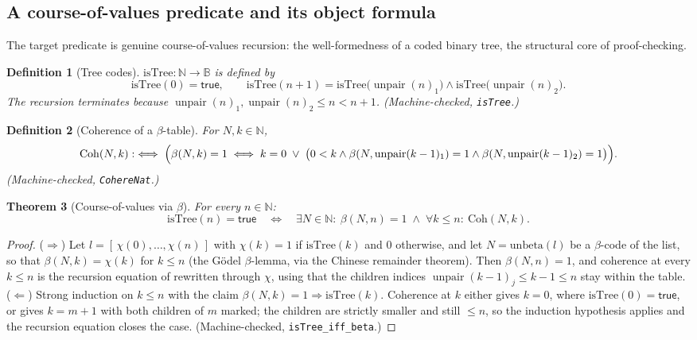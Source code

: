 \documentclass[11pt,a4paper]{article}
\newtheorem{theorem}{Theorem}[section]
\newtheorem{definition}[theorem]{Definition}
\newcommand{\Nat}{\mathbb{N}}
\newcommand{\Bool}{\mathbb{B}}
\newcommand{\unpair}{\operatorname{unpair}}
\begin{document}
\subsection{A course-of-values predicate and its object formula}

The target predicate is genuine course-of-values recursion: the
well-formedness of a coded binary tree, the structural core of
proof-checking.

\begin{definition}[Tree codes]
\label{def:istree}
$\mathrm{isTree} : \Nat \to \Bool$ is defined by
\[
  \mathrm{isTree}(0) = \mathsf{true},
  \qquad
  \mathrm{isTree}(n+1) =
  \mathrm{isTree}\bigl(\unpair(n)_1\bigr) \wedge
  \mathrm{isTree}\bigl(\unpair(n)_2\bigr).
\]
The recursion terminates because $\unpair(n)_1, \unpair(n)_2 \leq n
< n + 1$.
(Machine-checked, \texttt{isTree}.)
\end{definition}

\begin{definition}[Coherence of a $\beta$-table]
\label{def:cohere}
For $N, k \in \Nat$,
\[
  \mathrm{Coh}(N, k) :\iff
  \Bigl(\beta(N,k) = 1 \iff
    k = 0 \;\vee\;
    \bigl(0 < k \wedge \beta(N, \unpair(k-1)_1) = 1
      \wedge \beta(N, \unpair(k-1)_2) = 1\bigr)\Bigr).
\]
(Machine-checked, \texttt{CohereNat}.)
\end{definition}

\begin{theorem}[Course-of-values via $\beta$]
\label{thm:tree-beta}
For every $n \in \Nat$:
\[
  \mathrm{isTree}(n) = \mathsf{true}
  \quad\Longleftrightarrow\quad
  \exists N \in \Nat:\
  \beta(N, n) = 1 \;\wedge\;
  \forall k \leq n:\ \mathrm{Coh}(N,k).
\]
\end{theorem}
\begin{proof}
($\Rightarrow$) Let $l = [\,\chi(0), \ldots, \chi(n)\,]$ with
$\chi(k) = 1$ if $\mathrm{isTree}(k)$ and $0$ otherwise, and let
$N = \mathrm{unbeta}(l)$ be a $\beta$-code of the list, so that
$\beta(N,k) = \chi(k)$ for $k \leq n$ (the G\"odel $\beta$-lemma,
via the Chinese remainder theorem).
Then $\beta(N,n) = 1$, and coherence at every $k \leq n$ is the
recursion equation of  rewritten through $\chi$,
using that the children indices $\unpair(k-1)_j \leq k - 1 \leq n$
stay within the table.
($\Leftarrow$) Strong induction on $k \leq n$ with the claim
$\beta(N,k) = 1 \Rightarrow \mathrm{isTree}(k)$.
Coherence at $k$ either gives $k = 0$, where
$\mathrm{isTree}(0) = \mathsf{true}$, or gives $k = m + 1$ with both
children of $m$ marked; the children are strictly smaller and still
$\leq n$, so the induction hypothesis applies and the recursion
equation closes the case.
(Machine-checked, \texttt{isTree\_iff\_beta}.)
\end{proof}
\end{document}
